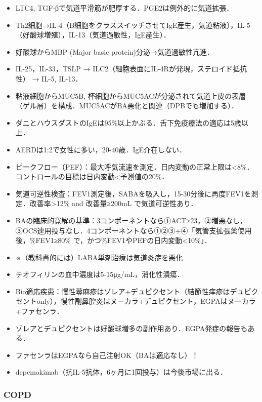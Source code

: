 \begin{itemize}
\item LTC4, TGF-βで気道平滑筋が肥厚する．PGE2は例外的に気道拡張．
\item Th2細胞→IL-4（B細胞をクラススイッチさせてIgE産生，気道粘液），IL-5（好酸球増殖），IL-13（気道過敏性，IgE産生）． 
\item 好酸球からMBP (Major basic protein)分泌→気道過敏性亢進．
\item IL-25，IL-33，TSLP → ILC2（細胞表面にIL-4Rが発現，ステロイド抵抗性） → IL-5, IL-13．
\item 粘液細胞からMUC5B, 杯細胞からMUC5ACが分泌されて気道上皮の表層（ゲル層）を構成．MUC5ACがBA悪化と関連（DPBでも増加する）．
\item ダニとハウスダストのIgEは95\%以上かぶる．舌下免疫療法の適応は5歳以上．
\item AERDは1:2で女性に多い，20-40歳．IgE介在しない．
\item ピークフロー（PEF）：最大呼気流速を測定．日内変動の正常上限は<8\%．コントロールの目標は日内変動<予測値の20\%．
\item 気道可逆性検査：FEV1測定後，SABAを吸入し，15-30分後に再度FEV1を測定．改善率>12\% and 改善量≥200mL で気道可逆性あり．
\item BAの臨床的寛解の基準：3コンポーネントなら①ACT≥23，②増悪なし，③OCS連用投与なし．4コンポーネントなら①②③+④「気管支拡張薬使用後，\%FEV1≥80\% で，かつ\%FEV1やPEFの日内変動<10\%」．
\item ※（教科書的には）LABA単剤治療は気道炎症を悪化
\item テオフィリンの血中濃度は5-15μg/mL，消化性潰瘍．
\item Bio適応疾患：慢性蕁麻疹はゾレア+デュピクセント（結節性痒疹はデュピクセントonly），慢性副鼻腔炎はヌーカラ+デュピクセント，EGPAはヌーカラ+ファセンラ．
\item ゾレアとデュピクセントは好酸球増多の副作用あり．EGPA発症の報告もある．
\item ファセンラはEGPAなら自己注射OK（BAは適応なし）！
\item depemokimab（抗IL-5抗体，6ヶ月に1回投与）は今後市場に出る．

\end{itemize}

\subsubsection{COPD}

